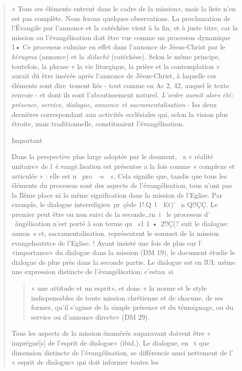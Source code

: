 \begin{quote}
« Tous ces éléments entrent dans le cadre de la mission»,
mais la liste n'en est pas complète. Nous ferons quelques
observations. La proclamation de l'Évangile par l'annonce et
la catéchèse vient à la fin, et à juste titre, car la mission ou
l'évangélisation doit être vue comme un processus dynamique 1•
Ce processus culmine en effet dans l'annonce de Jésus-Christ
par le \textit{kèrugma} (annonce) et la \textit{didachè} (catéchèse). Selon le
même principe, toutefois, la phrase « la vie liturgique, la prière
et la contemplation » aurait dû être insérée après l'annonce de
Jésus-Christ, à laquelle ces éléments sont dire~tement liés
- tout comme en Ac 2, 42, auquel le texte renvoie - et dont
ils sont l'aboutissement naturel. \textit{L'ordre aurait alors été: présence,
service, dialogue, annonce et sacramentalisation} - Ies
deux dernières correspondant aux activités ecclésiales qui,
selon la vision plus étroite, mais traditionnelle, constituaient
l'évangélisation.
\begin{Synthesis}
Important
\end{Synthesis}
Dans la perspective plus large adoptée par le doument, ~a
« réalité unitaire» de l~é.vangé.lisation est présentee a la fois
comme « complexe et articulée » : elle est u~ pro~~-s~~s. Cela
signifie que, tandis que tous les éléments du processus sont
des aspects de l'évangélisation, tous n'ont pas la Ilême place
ni la même signification dans la mission de l'Eglise. Par
exemple, le dialogue interreligieu~pr~çède 1!.Q~l~~Et)' ~n
Q!!ÇÇ. Le premier peut être ou non suivi de la seconde,.rn~i~
le processus d' ~\'angélisation n'est porté à son terme qu~ s1
1 •~2!!Ç(? suit le dialogue: annon~e et, sacramentalisation.
représentent le sommet de la mission evangehsatrtce de l'Eglise. !
Ayant insisté une fois de plus sur l' «importance» du dialogue
dans la mission (DM 19), le document étudie le dialogue
de plus près dans la seconde partie. Le dialogue est en lUI:
même une expression distincte de l'évangélisation; c'estau~si
\begin{quote}
    « une attitude et un esprit», et donc « la norme et le style indispensables
de toute mission chrétienne et de chacune. de ses
formes, qu'il s'agisse de la simple présence et du témoignage,
ou du service ou d'annonce directe» (DM 29). 
\end{quote}
Tous les aspects
de la mission énumérés auparavant doivent être « imprégné[s]
de l'esprit de dialogue» (ibid.). Le dialogue, en ~t que dimension
distincte de l'évangélisation, se différencie amsi nettement
de l' « esprit de dialogue» qui doit informer toutes les

\end{quote}
